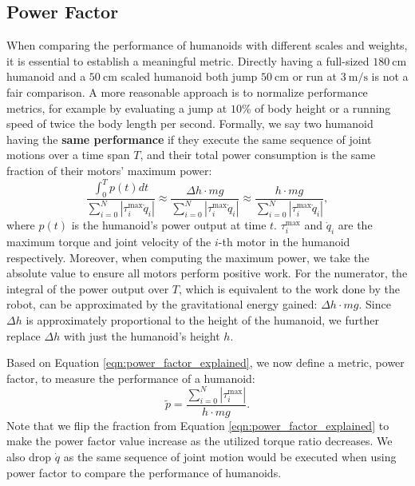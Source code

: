 \subsection{Power Factor}
\label{sec:power_metric}
When comparing the performance of humanoids with different scales and weights, it is essential to establish a meaningful metric. Directly having a full-sized $180~\mathrm{cm}$ humanoid and a $50~\mathrm{cm}$ scaled humanoid both jump $50~\mathrm{cm}$ or run at $3~\mathrm{m/s}$ is not a fair comparison. A more reasonable approach is to normalize performance metrics, for example by evaluating a jump at $10\%$ of body height or a running speed of twice the body length per second. Formally, we say two humanoid having the \textbf{same performance} if they execute the same sequence of joint motions over a time span $T$, and their total power consumption is the same fraction of their motors’ maximum power:
\begin{equation}
     \frac{\int_0^T{{p}(t) dt}}{\sum_{i=0}^{N}|{\tau}_{i}^{\text{max}}\dot{q}_i|} \approx
     \frac{\Delta h \cdot mg}{\sum_{i=0}^{N}|{\tau}_{i}^{\text{max}}\dot{q}_i|} \approx   \frac{h \cdot mg}{\sum_{i=0}^{N}|{\tau}_{i}^{\text{max}}\dot{q}_i|},
\label{eqn:power_factor_explained}
\end{equation}
where $p(t)$ is the humanoid's power output at time $t$. $\tau^\text{max}_i$ and $\dot{q}_i$ are the maximum torque and joint velocity of the $i$-th motor in the humanoid respectively. Moreover, when computing the maximum power, we take the absolute value to ensure all motors perform positive work. For the numerator, the integral of the power output over $T$, which is equivalent to the work done by the robot, can be approximated by the gravitational energy gained: $\Delta h \cdot mg$. Since $\Delta h$ is approximately proportional to the height of the humanoid, we further replace $\Delta h $ with just the humanoid's height $h$.

Based on Equation \ref{eqn:power_factor_explained}, we now define a metric, power factor, to measure the performance of a humanoid:
\begin{equation}
    \tilde{\mathit{p}} = \frac{\sum_{i=0}^{\mathit{N}} |\tau_{i}^{\max}|}{h \cdot m g}.
\end{equation}
Note that we flip the fraction from Equation \ref{eqn:power_factor_explained} to make the power factor value increase as the utilized torque ratio decreases. We also drop $\dot{q}$ as the same sequence of joint motion would be executed when using power factor to compare the performance of humanoids.


